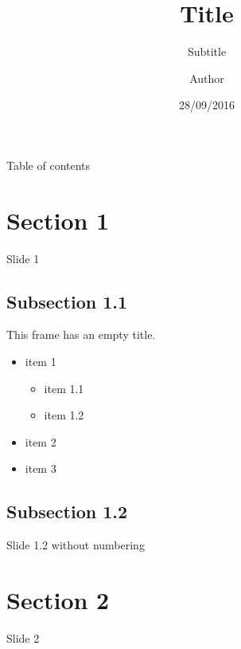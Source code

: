 \documentclass{beamer}
\title{Title}
\subtitle{Subtitle}
\author{Author}
\date{28/09/2016}
\begin{document}
    \begin{frame}
        \maketitle
    \end{frame}
    
    \begin{frame}{Table of contents}
      \tableofcontents
    \end{frame}
    
    \section{Section 1}
    \begin{frame}{Slide 1}
        \lipsum[1]
    \end{frame}
    
    \subsection{Subsection 1.1}
    \begin{frame}
        This frame has an empty title.
        \vfill
        \begin{itemize}
            \item item 1
            \begin{itemize}
                \item item 1.1
                \item item 1.2
            \end{itemize}
            \item item 2
            \item item 3
        \end{itemize}
    \end{frame}
    
    \subsection{Subsection 1.2}
    
    { %
        \begin{frame}{Slide 1.2 without numbering}
            \lipsum[2]
        \end{frame}
        \addtocounter{page}{-1}
    }
    
    \section{Section 2}
    \begin{frame}{Slide 2}
        \lipsum[3]
    \end{frame}
\end{document}
